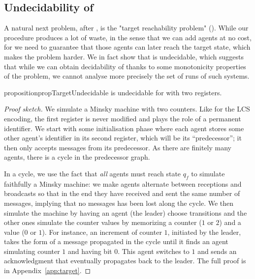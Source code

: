 \subsection{Undecidability of \TARGET}
\label{sec:undec-target}

A natural next problem, after \COVER, is the "target reachability problem" (\TARGET).  
While our \COVER procedure produces a lot of waste, in the sense that we can add agents at no cost, for \TARGET we need to guarantee that those agents can later reach the target state, which makes the problem harder. 
We in fact show that \TARGET is undecidable, which suggests that while we can obtain decidability of \COVER thanks to some monotonicity properties of the problem, we cannot analyse more precisely the set of runs of such systems.

\begin{restatable}{proposition}{propTargetUndecidable}
\label{prop:target-undec}
\TARGET is undecidable for \BNRA with two registers.
\end{restatable}

\begin{proof}[Proof sketch]
We simulate a Minsky machine with two counters. Like for the LCS encoding, the first register is never modified and plays the role of a permanent identifier. We start with some initialisation phase where each agent stores some other agent's identifier in its second register, which will be its ``predecessor''; it then only accepts messages from its predecessor. As there are finitely many agents, there is a cycle in the predecessor graph. 

In a cycle, we use the fact that \emph{all} agents must reach state $q_f$ to simulate faithfully a Minsky machine: we make agents alternate between receptions and broadcasts so that in the end they have received and sent the same number of messages, implying that no messages has been lost along the cycle.
We then simulate the machine by having an agent (the leader) choose transitions and the other ones simulate the counter values by memorizing a counter ($1$ or $2$) and a value ($0$ or $1$). For instance, an increment of counter $1$, initiated by the leader, takes the form of a message propagated in the cycle until it finds an agent simulating counter $1$ and having bit $0$. This agent switches to $1$ and sends an acknowledgment that eventually propagates back to the leader. The full proof is in Appendix~\ref{app:target}. 
\end{proof}
